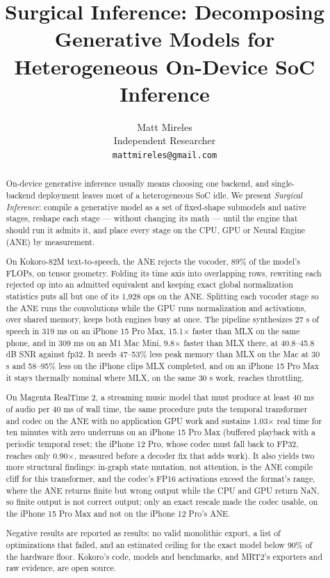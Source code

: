 \documentclass[11pt]{article}
\title{Surgical Inference: Decomposing Generative Models for\\Heterogeneous On-Device SoC Inference}
\author{Matt Mireles\\Independent Researcher\\\texttt{mattmireles@gmail.com}}
\date{}
\begin{document}
\maketitle

\begin{abstract}
On-device generative inference usually means choosing one backend, and single-backend deployment leaves most of a heterogeneous SoC idle. We present \emph{Surgical Inference}: compile a generative model as a set of fixed-shape submodels and native stages, reshape each stage --- without changing its math --- until the engine that should run it admits it, and place every stage on the CPU, GPU or Neural Engine (ANE) by measurement.

On Kokoro-82M text-to-speech, the ANE rejects the vocoder, 89\% of the model's FLOPs, on tensor geometry. Folding its time axis into overlapping rows, rewriting each rejected op into an admitted equivalent and keeping exact global normalization statistics puts all but one of its 1,928 ops on the ANE. Splitting each vocoder stage so the ANE runs the convolutions while the GPU runs normalization and activations, over shared memory, keeps both engines busy at once. The pipeline synthesizes 27 s of speech in 319 ms on an iPhone 15 Pro Max, 15.1$\times$ faster than MLX on the same phone, and in 309 ms on an M1 Mac Mini, 9.8$\times$ faster than MLX there, at 40.8--45.8 dB SNR against fp32. It needs 47--53\% less peak memory than MLX on the Mac at 30 s and 58--95\% less on the iPhone clips MLX completed, and on an iPhone 15 Pro Max it stays thermally nominal where MLX, on the same 30 s work, reaches throttling. 

On Magenta RealTime 2, a streaming music model that must produce at least 40 ms of audio per 40 ms of wall time, the same procedure puts the temporal transformer and codec on the ANE with no application GPU work and sustains 1.03$\times$ real time for ten minutes with zero underruns on an iPhone 15 Pro Max (buffered playback with a periodic temporal reset; the iPhone 12 Pro, whose codec must fall back to FP32, reaches only 0.90$\times$, measured before a decoder fix that adds work). It also yields two more structural findings: in-graph state mutation, not attention, is the ANE compile cliff for this transformer, and the codec's FP16 activations exceed the format's range, where the ANE returns finite but wrong output while the CPU and GPU return NaN, so finite output is not correct output; only an exact rescale made the codec usable, on the iPhone 15 Pro Max and not on the iPhone 12 Pro's ANE.

Negative results are reported as results: no valid monolithic export, a list of optimizations that failed, and an estimated ceiling for the exact model below 90\% of the hardware floor. Kokoro's code, models and benchmarks, and MRT2's exporters and raw evidence, are open source.
\end{abstract}
\end{document}
